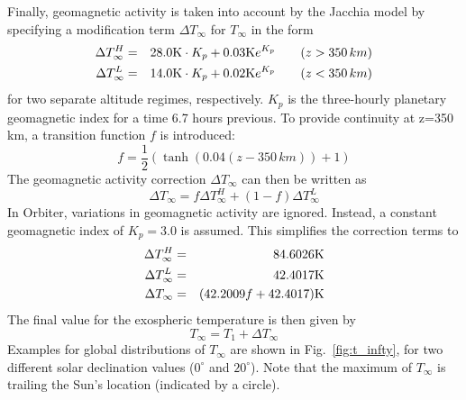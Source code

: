 \documentclass[a4paper]{article}
\begin{document}
Finally, geomagnetic activity is taken into account by the Jacchia model by specifying a modification term $\Delta T_\infty$ for $T_\infty$ in the form
\begin{eqnarray}
\Delta T^H_\infty &=& 28.0\mathrm{K} \cdot K_p + 0.03\mathrm{K} e^{K_p}\qquad (z > 350\,km) \\
\Delta T^L_\infty &=& 14.0\mathrm{K} \cdot K_p + 0.02\mathrm{K} e^{K_p}\qquad (z < 350\,km)
\end{eqnarray}
for two separate altitude regimes, respectively. $K_p$ is the three-hourly planetary geomagnetic index for a time 6.7 hours previous. To provide continuity at z=350\,km, a transition function $f$ is introduced:
\begin{equation}
f = \frac{1}{2} (\tanh(0.04 (z - 350\,km)) + 1)
\end{equation}
The geomagnetic activity correction $\Delta T_\infty$ can then be written as
\begin{equation}
\Delta T_\infty = f \Delta T^H_\infty + (1-f) \Delta T^L_\infty
\end{equation}
In Orbiter, variations in geomagnetic activity are ignored. Instead, a constant geomagnetic index of $K_p = 3.0$ is assumed. This simplifies the correction terms to
\begin{eqnarray}
\Delta T^H_\infty &=& 84.6026\mathrm{K} \\
\Delta T^L_\infty &=& 42.4017\mathrm{K} \\
\Delta T_\infty &=& (42.2009 f + 42.4017)\mathrm{K}
\end{eqnarray}
The final value for the exospheric temperature is then given by
\begin{equation}
T_\infty = T_1 + \Delta T_\infty
\end{equation}
Examples for global distributions of $T_\infty$ are shown in Fig.~\ref{fig:t_infty}, for two different solar declination values ($0^\circ$ and $20^\circ$). Note that the maximum of $T_\infty$ is trailing the Sun's location (indicated by a circle).
\end{document}
